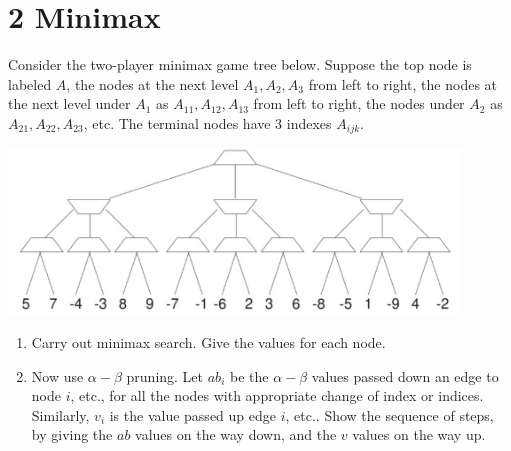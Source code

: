 \documentclass[12pt]{article}
\begin{document}
\clearpage

\section*{2 Minimax}

Consider the two-player minimax game tree below.  Suppose the top node
is labeled $A$, the nodes at the next level $A_1, A_2, A_3$ from left
to right, the nodes at the next level under $A_1$ as $A_{11}, A_{12},
A_{13}$ from left to right, the nodes under $A_2$ as $A_{21}, A_{22},
A_{23}$, etc.  The terminal nodes have 3 indexes $A_{ijk}$.

\centerline{\includegraphics[width=0.9\textwidth]{minimax.png}}

\begin{enumerate}

\item Carry out minimax search.  Give the values for each node.

\item Now use $\alpha-\beta$ pruning.  Let $ab_{i}$ be the
  $\alpha-\beta$ values passed down an edge to node $i$, etc., for all
  the nodes with appropriate change of index or indices.  Similarly,
  $v_i$ is the value passed up edge $i$, etc..  Show the sequence of
  steps, by giving the $ab$ values on the way down, and the $v$ values
  on the way up.

\end{enumerate}
\end{document}
